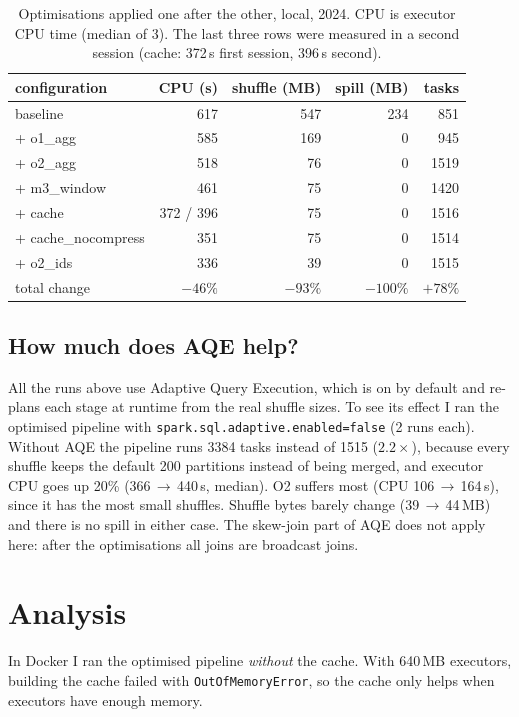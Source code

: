 \documentclass[sigconf]{acmart}
\begin{document}
\begin{table}[t]
\caption{Optimisations applied one after the other, local, 2024. CPU is
executor CPU time (median of 3). The last three rows were measured in a second
session (cache: 372\,s first session, 396\,s second).}
\label{tab:opt}
\small
\begin{tabular}{lrrrr}
\toprule
configuration & CPU (s) & shuffle (MB) & spill (MB) & tasks \\
\midrule
baseline & 617 & 547 & 234 & 851 \\
+ o1\_agg & 585 & 169 & 0 & 945 \\
+ o2\_agg & 518 & 76 & 0 & 1519 \\
+ m3\_window & 461 & 75 & 0 & 1420 \\
+ cache & 372 / 396 & 75 & 0 & 1516 \\
+ cache\_nocompress & 351 & 75 & 0 & 1514 \\
+ o2\_ids & 336 & 39 & 0 & 1515 \\
\midrule
total change & $-46\%$ & $-93\%$ & $-100\%$ & $+78\%$ \\
\bottomrule
\end{tabular}
\end{table}

\subsection{How much does AQE help?}
All the runs above use Adaptive Query Execution, which is on by default and
re-plans each stage at runtime from the real shuffle sizes. To see its effect
I ran the optimised pipeline with \texttt{spark.sql.adaptive.enabled=false}
(2 runs each). Without AQE the pipeline runs 3384 tasks instead of 1515
($2.2\times$), because every shuffle keeps the default 200 partitions instead
of being merged, and executor CPU goes up 20\% (366\,$\to$\,440\,s, median).
O2 suffers most (CPU 106\,$\to$\,164\,s), since it has the most small
shuffles. Shuffle bytes barely change (39\,$\to$\,44\,MB) and there is no
spill in either case. The skew-join part of AQE does not apply here: after the
optimisations all joins are broadcast joins.

\section{Analysis}
\label{sec:analysis}
In Docker I ran the optimised pipeline \emph{without} the cache. With 640\,MB
executors, building the cache failed with \texttt{OutOfMemoryError}, so the
cache only helps when executors have enough memory.
\end{document}
